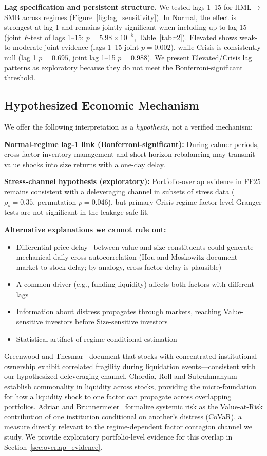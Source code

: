 \documentclass[sigconf,anonymous]{acmart}
\begin{document}
\textbf{Lag specification and persistent structure.} We tested lags 1--15 for
HML$\to$SMB across regimes (Figure~\ref{fig:lag_sensitivity}). In Normal, the
effect is strongest at lag 1 and remains jointly significant when including up
to lag 15 (joint $F$-test of lags 1--15: $p = 5.98 \times 10^{-5}$,
Table~\ref{tab:r2}). Elevated shows weak-to-moderate joint evidence
(lags 1--15 joint $p = 0.002$), while Crisis is consistently
null (lag 1 $p = 0.695$, joint lag 1--15 $p = 0.988$). We present Elevated/Crisis lag
patterns as exploratory because they do not meet the Bonferroni-significant threshold.

\subsection{Hypothesized Economic Mechanism}
\label{sec:interpretation}

We offer the following interpretation as a \emph{hypothesis}, not a verified mechanism:

\textbf{Normal-regime lag-1 link (Bonferroni-significant):} During calmer periods,
cross-factor inventory management and short-horizon rebalancing may transmit
value shocks into size returns with a one-day delay.

\textbf{Stress-channel hypothesis (exploratory):} Portfolio-overlap evidence in
FF25 remains consistent with a deleveraging channel in subsets of stress data
($\rho_s = 0.35$, permutation $p = 0.046$), but primary Crisis-regime
factor-level Granger tests are not significant in the leakage-safe fit.

\textbf{Alternative explanations we cannot rule out:}
\begin{itemize}
    \item Differential price delay~\cite{hou2005market} between value and size constituents
    could generate mechanical daily cross-autocorrelation (Hou and Moskowitz document
    market-to-stock delay; by analogy, cross-factor delay is plausible)
    \item A common driver (e.g., funding liquidity) affects both factors with different lags
    \item Information about distress propagates through markets, reaching Value-sensitive
    investors before Size-sensitive investors
    \item Statistical artifact of regime-conditional estimation
\end{itemize}

Greenwood and Thesmar~\cite{greenwood2011stock} document that stocks with
concentrated institutional ownership exhibit correlated fragility during
liquidation events---consistent with our hypothesized deleveraging channel.
Chordia, Roll and Subrahmanyam~\cite{chordia2000commonality} establish commonality
in liquidity across stocks, providing the micro-foundation for how a liquidity shock
to one factor can propagate across overlapping portfolios.
Adrian and Brunnermeier~\cite{adrian2016covar} formalize systemic risk as the
Value-at-Risk contribution of one institution conditional on another's distress (CoVaR),
a measure directly relevant to the regime-dependent factor contagion channel we study.
We provide exploratory portfolio-level evidence for this overlap in
Section~\ref{sec:overlap_evidence}.
\end{document}
